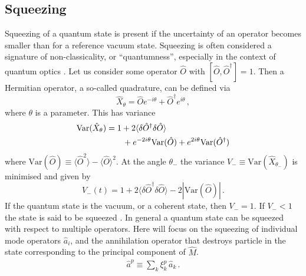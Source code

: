 \documentclass[aps,prd,twocolumn,superscriptaddress]{revtex4-1}
\begin{document}
\subsection{Squeezing} \label{sq_subsection}
Squeezing of a quantum state is present if the uncertainty of an operator becomes smaller than for a reference vacuum state. Squeezing is often considered a signature of non-classicality, or ``quantumness'', especially in the context of quantum optics \cite{TanasKielich1983, drummond2013quantum}.
Let us consider some operator $\hat O$ with $[\hat O, \hat O^\dagger] = 1$. Then a Hermitian operator, a so-called quadrature, can be defined via
\begin{equation}
     \hat X_\theta = \hat O e^{-i \theta}+\hat O^\dagger e^{i \theta} \,, 
\end{equation}
%
where $\theta$ is a parameter.
%
This has variance
%
\begin{align} 
    \mathrm{Var}(\hat  X_\theta) & =  1+ 2 \langle \delta \hat O^\dagger \delta \hat O\rangle   \notag\\
    & \qquad+ e^{-2i \theta} \mathrm{Var}(\hat O) + e^{2i \theta} \mathrm{Var}(\hat O^\dagger)
\end{align}
where $\mathrm{Var}(\hat  O) \equiv \langle \hat O^2 \rangle - \langle \hat O \rangle^2 $. 
%
%
At the angle $\theta_-$ the variance $V_- \equiv \mathrm{Var}(\hat  X_{\theta_-})$ is minimised and given by
%
\begin{equation}\label{generalVminus}
    V_-(t) = 1+ 2 \langle \delta \hat O^\dagger \delta \hat O\rangle  - 2 |\mathrm{Var}(\hat O)|\,.
\end{equation}
If the quantum state is the vacuum, or a coherent state, then $V_- =1$. If $V_- < 1$ the state is said to be squeezed \cite{drummond2013quantum}. 
In general a quantum state can be squeezed with respect to multiple operators. 
Here will focus on the squeezing of individual mode operators $\hat a_i$, and the annihilation operator that destroys particle in the state corresponding to the principal component of $\hat M$.
\begin{align} \label{a_op}
 \hat a^{p}  \equiv   \sum_k  \xi^p_{k} \,  \hat a_k\,.
\end{align}
\end{document}

